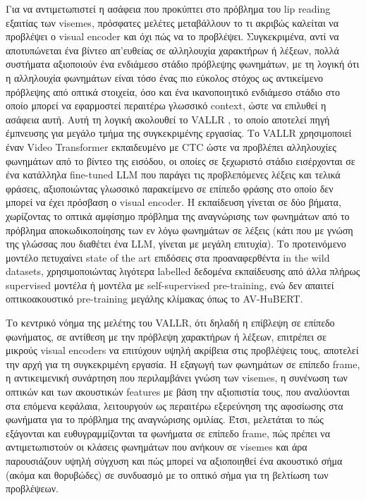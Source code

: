 Για να αντιμετωπιστεί η ασάφεια που προκύπτει στο πρόβλημα του lip reading εξαιτίας των visemes, πρόσφατες μελέτες μεταβάλλουν το τι ακριβώς καλείται να προβλέψει ο visual encoder και όχι πώς να το προβλέψει. Συγκεκριμένα, αντί να αποτυπώνεται ένα βίντεο απ'ευθείας σε αλληλουχία χαρακτήρων ή λέξεων, πολλά συστήματα αξιοποιούν ένα ενδιάμεσο στάδιο πρόβλεψης φωνημάτων, με τη λογική ότι η αλληλουχία φωνημάτων είναι τόσο ένας πιο εύκολος στόχος ως αντικείμενο πρόβλεψης από οπτικά στοιχεία, όσο και ένα ικανοποιητικό ενδιάμεσο στάδιο στο οποίο μπορεί να εφαρμοστεί περαιτέρω γλωσσικό context, ώστε να επιλυθεί η ασάφεια αυτή. Αυτή τη λογική ακολουθεί το VALLR \cite{thomas2026vallrvisualasrlanguage}, το οποίο αποτελεί πηγή έμπνευσης για μεγάλο τμήμα της συγκεκριμένης εργασίας. Το VALLR χρησιμοποιεί έναν Video Transformer εκπαιδευμένο με CTC ώστε να προβλέπει αλληλουχίες φωνημάτων από το βίντεο της εισόδου, οι οποίες σε ξεχωριστό στάδιο εισέρχονται σε ένα κατάλληλα fine-tuned LLM που παράγει τις προβλεπόμενες λέξεις και τελικά φράσεις, αξιοποιώντας γλωσσικό παρακείμενο σε επίπεδο φράσης στο οποίο δεν μπορεί να έχει πρόσβαση ο visual encoder. Η εκπαίδευση γίνεται σε δύο βήματα, χωρίζοντας το οπτικά αμφίσημο πρόβλημα της αναγνώρισης των φωνημάτων από το πρόβλημα αποκωδικοποίησης των εν λόγω φωνημάτων σε λέξεις (κάτι που με γνώση της γλώσσας που διαθέτει ένα LLM, γίνεται με μεγάλη επιτυχία). Το προτεινόμενο μοντέλο πετυχαίνει state of the art επιδόσεις στα προαναφερθέντα in the wild datasets, χρησιμοποιώντας λιγότερα labelled δεδομένα εκπαίδευσης από άλλα πλήρως supervised μοντέλα ή μοντέλα με self-supervised pre-training, ενώ δεν απαιτεί οπτικοακουστικό pre-training μεγάλης κλίμακας όπως το AV-HuBERT.

Το κεντρικό νόημα της μελέτης του VALLR, ότι δηλαδή η επίβλεψη σε επίπεδο φωνήματος, σε αντίθεση με την πρόβλεψη χαρακτήρων ή λέξεων, επιτρέπει σε μικρούς visual encoders να επιτύχουν υψηλή ακρίβεια στις προβλέψεις τους, αποτελεί την αρχή για τη συγκεκριμένη εργασία. Η εξαγωγή των φωνημάτων σε επίπεδο frame, η αντικειμενική συνάρτηση που περιλαμβάνει γνώση των visemes, η συνένωση των οπτικών και των ακουστικών features με βάση την αξιοπιστία τους, που αναλύονται στα επόμενα κεφάλαια, λειτουργούν ως περαιτέρω εξερεύνηση της αφοσίωσης στα φωνήματα για το πρόβλημα της αναγνώρισης ομιλίας. Έτσι, μελετάται το πώς εξάγονται και ευθυγραμμίζονται τα φωνήματα σε επίπεδο frame, πώς πρέπει να αντιμετωπιστούν οι κλάσεις φωνημάτων που ανήκουν σε visemes και άρα παρουσιάζουν υψηλή σύγχυση και πώς μπορεί να αξιοποιηθεί ένα ακουστικό σήμα (ακόμα και θορυβώδες) σε συνδυασμό με το οπτικό σήμα για τη βελτίωση των προβλέψεων.